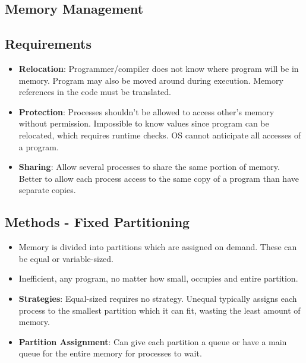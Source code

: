 \documentclass[fontsize=4.5pt]{scrartcl}
\begin{document}
\begin{multicols}{3}
   \section{Memory Management}
      \subsection{Requirements}
        \begin{itemize}
          \item \textbf{Relocation}: Programmer/compiler does not know where program will be in memory. Program may also be 
                    moved around during execution. Memory references in the code must be translated.
          \item \textbf{Protection}: Processes shouldn't be allowed to access other's memory without permission. Impossible to know
                    values since program can be relocated, which requires runtime checks. OS cannot anticipate all accesses of a program.
          \item \textbf{Sharing}: Allow several processes to share the same portion of memory. Better to allow each
                    process access to the same copy of a program than have separate copies.
        \end{itemize}
        \subsection{Methods - Fixed Partitioning}
        \begin{itemize}
          \item Memory is divided into partitions which are assigned on demand. These can be equal or variable-sized.
          \item Inefficient, any program, no matter how small, occupies and entire partition.  
          \item \textbf{Strategies}: Equal-sized requires no strategy. Unequal typically assigns each process to the smallest partition which it can fit,
                wasting the least amount of memory.
          \item \textbf{Partition Assignment}: Can give each partition a queue or have a main queue for the entire memory for processes to wait.
        \end{itemize}

\end{multicols}
\end{document}
